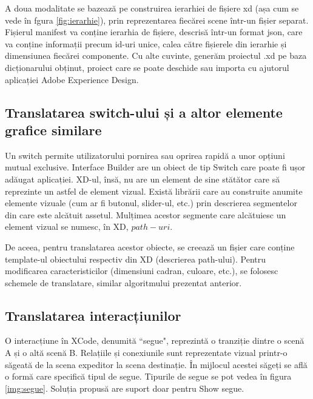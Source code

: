 A doua modalitate se bazează pe construirea ierarhiei de fișiere xd (așa cum se vede în fgura \ref{fig:ierarhie}), prin reprezentarea fiecărei scene într-un fișier separat. Fișierul manifest va conține ierarhia de fișiere, descrisă într-un format json, care va conține informații precum id-uri unice, calea către fișierele din ierarhie și dimensiunea fiecărei componente. Cu alte cuvinte, generăm proiectul .xd pe baza dicționarului obținut, proiect care se poate deschide sau importa cu ajutorul aplicației Adobe Experience Design.

\subsection{Translatarea switch-ului și a altor elemente grafice similare}

Un switch permite utilizatorului pornirea sau oprirea rapidă a unor opțiuni mutual exclusive. 
Interface Builder are un obiect de tip Switch care poate fi ușor adăugat aplicației. XD-ul, însă, nu are un element de sine stătător care să reprezinte un astfel de element vizual. Există librării care au construite anumite elemente vizuale (cum ar fi butonul, slider-ul, etc.) prin descrierea segmentelor din care este alcătuit assetul. Mulțimea acestor segmente care alcătuiesc un element vizual se numesc, în XD, $path-uri$.

De aceea, pentru translatarea acestor obiecte, se creează un fișier care conține template-ul obiectului respectiv din XD (descrierea path-ului). Pentru modificarea caracteristicilor (dimensiuni cadran, culoare, etc.), se folosesc schemele de translatare, similar algoritmului prezentat anterior.

\subsection{Translatarea interacțiunilor}

O interacțiune în XCode, denumită ``segue", reprezintă o tranziție dintre o scenă A și o altă scenă B. Relațiile și conexiunile sunt reprezentate vizual printr-o săgeată de la scena expeditor la scena destinație. În mijlocul acestei săgeți se află o formă care specifică tipul de segue. Tipurile de segue se pot vedea în figura \ref{img:segue}. Soluția propusă are suport doar pentru Show segue.



